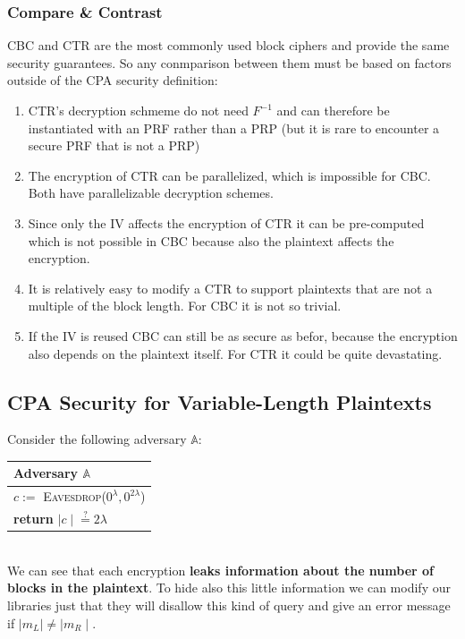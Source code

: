 \documentclass{article}
\begin{document}
\begin{adjustwidth}{2em}{2em}
\begin{adjustwidth}{2em}{2em}
				\subsubsection{Compare \& Contrast}
				\begin{adjustwidth}{2em}{1em}
					CBC and CTR are the most commonly used block ciphers and provide the same security guarantees. So any conmparison between them must be based on factors outside of the CPA security definition:
					\begin{enumerate}
						\item CTR's decryption schmeme do not need $F^{-1}$  and can therefore be instantiated with an PRF rather than a PRP (but it is rare to encounter a secure PRF that is not a PRP)
						\item The encryption of CTR can be parallelized, which is impossible for CBC. Both have parallelizable decryption schemes.
						\item Since only the IV affects the encryption of CTR it can be pre-computed which is not possible in CBC because also the plaintext affects the encryption.
						\item It is relatively easy to modify a CTR to support plaintexts that are not a multiple of the block length. For CBC it is not so trivial.
						\item If the IV is reused CBC can still be as secure as befor, because the encryption also depends on the plaintext itself. For CTR it could be quite devastating.
					\end{enumerate}
				\end{adjustwidth}
			\end{adjustwidth}
			\subsection{CPA Security for Variable-Length Plaintexts}
			\begin{adjustwidth}{2em}{2em}
				Consider the following adversary $\mathbb{A}$: \\
				\begin{center}
					\begin{tabular}{|l|}
						\hline
						\cellcolor{gray!80} Adversary $\mathbb{A}$ \\
						\hline
						$c :=$ \textsc{Eavesdrop}($0^{\lambda}, 0^{2\lambda}$) \\
						\textbf{return} $\mid c \mid \stackrel{?}{=} 2 \lambda$ \\
						\hline
					\end{tabular}
				\end{center}
				\hfill \\
				We can see that each encryption \textbf{leaks information about the number of blocks in the plaintext}. To hide also this little information we can modify our libraries just that they will disallow this kind of query and give an error message if $\mid m_L \mid \neq \mid m_R \mid$. 

\end{adjustwidth}
\end{adjustwidth}
\end{document}

